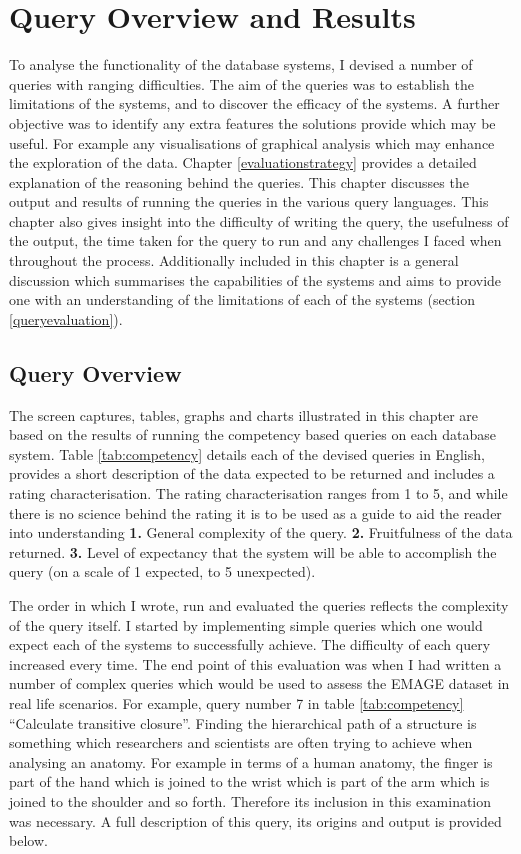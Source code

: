 \chapter{Query Overview and Results}\label{results}
To analyse the functionality of the database systems, I devised a number of queries with ranging difficulties. The aim of the queries was to establish the limitations of the systems, and to discover the efficacy of the systems. A further objective was to identify any extra features the solutions provide which may be useful. For example any visualisations of graphical analysis which may enhance the exploration of the data. Chapter \ref{evaluationstrategy} provides a detailed explanation of the reasoning behind the queries. This chapter discusses the output and results of running the queries in the various query languages. This chapter also gives insight into the difficulty of writing the query, the usefulness of the output, the time taken for the query to run and any challenges I faced when throughout the process. Additionally included in this chapter is a general discussion which summarises the capabilities of the systems and aims to provide one with an understanding of the limitations of each of the systems (section  \ref{queryevaluation}).

\section{Query Overview}\label{output}
The screen captures, tables, graphs and charts illustrated in this chapter are based on the results of running the competency based queries on each database system. Table \ref{tab:competency} details each of the devised queries in English, provides a short description of the data expected to be returned and includes a rating characterisation. The rating characterisation ranges from 1 to 5, and while there is no science behind the rating it is to be used as a guide to aid the reader into understanding \textbf{1.} General complexity of the query. \textbf{2.} Fruitfulness of the data returned. \textbf{3.} Level of expectancy that the system will be able to accomplish the query (on a scale of 1 expected, to 5 unexpected).

The order in which I wrote, run and evaluated the queries reflects the complexity of the query itself. I started by implementing simple queries which one would expect each of the systems to successfully achieve. The difficulty of each query increased every time. The end point of this evaluation was when I had written a number of complex queries which would be used to assess the EMAGE dataset in real life scenarios. For example, query number 7 in table \ref{tab:competency} ``Calculate transitive closure''. Finding the hierarchical path of a structure is something which researchers and scientists are often trying to achieve when analysing an anatomy. For example in terms of a human anatomy, the finger is part of the hand which is joined to the wrist which is part of the arm which is joined to the shoulder and so forth. Therefore its inclusion in this examination was necessary. A full description of this query, its origins and output is provided below. 

